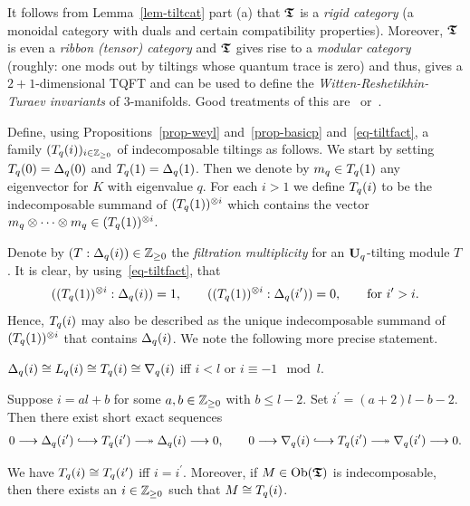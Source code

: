 \begin{rem}\label{rem-ribbon}
It follows from Lemma~\ref{lem-tiltcat} part (a) 
that $\boldsymbol{\mathfrak{T}}$ is a \textit{rigid category} 
(a monoidal category with duals and certain compatibility properties). 
Moreover, $\boldsymbol{\mathfrak{T}}$ is even a \textit{ribbon (tensor) category} and 
$\boldsymbol{\mathfrak{T}}$ gives rise to a \textit{modular category} 
(roughly: one mods out by tiltings whose quantum trace is zero) 
and thus, gives a $2+1$-dimensional TQFT and can 
be used to define the \textit{Witten-Reshetikhin-Turaev invariants} of $3$-manifolds. 
Good treatments of this are~\cite[Section~4]{an1} or~\cite[Section~7]{saw}.
\end{rem}



Define, using Propositions~\ref{prop-weyl} 
and~\ref{prop-basicp} and~\eqref{eq-tiltfact}, 
a family $(T_q({i}))_{i\in\mathbb{Z}_{\geq 0}}$ of indecomposable tiltings as follows. 
We start by setting $T_q({0})=\Delta_q({0})$ and $T_q({1})=\Delta_q({1})$. 
Then we denote by $m_q\in T_q({1})$ any eigenvector for $K$ with eigenvalue $q$. 
For each $i>1$ we define $T_q({i})$ to be the indecomposable 
summand of $(T_q({1}))^{\otimes i}$ which contains 
the vector $m_q\otimes\cdots\otimes m_q\in (T_q({1}))^{\otimes i}$.



Denote by $(T:\Delta_q({i}))\in\mathbb{Z}_{\geq 0}$ the \textit{filtration multiplicity} for an $\boldsymbol{\mathrm{U}}_q$-tilting module $T$. It is clear, by using~\eqref{eq-tiltfact}, that
\begin{equation}\label{eq-tiltfact2}
((T_q({1}))^{\otimes i}:\Delta_q({i}))=1,\quad\quad((T_q({1}))^{\otimes i}:\Delta_q({i^{\prime}}))=0,\quad\quad\text{for } i^{\prime}>i.
\end{equation}
Hence, $T_q({i})$ may also be described as 
the unique indecomposable summand of 
$(T_q({1}))^{\otimes i}$ that contains $\Delta_q({i})$. We note the following more precise statement.



\begin{prop}\label{prop-tilt}
\item[(a)] $\Delta_q({i})\cong L_q({i})\cong T_q({i})\cong\nabla_q({i})$ iff $i<l$ or $i\equiv -1\mod l$.
\item[(b)] Suppose $i=al+b$ for some $a,b\in\mathbb{Z}_{\geq 0}$ with 
$b\leq l-2$. Set $i^{\prime}=(a+2)l-b-2$. Then there exist short exact sequences
\[
0\longrightarrow \Vn{i^{\prime}}\hooklongrightarrow\Tn{i^{\prime}}\twoheadlongrightarrow \Vn{i}\longrightarrow 0,\quad\quad
0\longrightarrow \dVn{i}\hooklongrightarrow\Tn{i^{\prime}}\twoheadlongrightarrow \dVn{i^{\prime}}\longrightarrow 0.
\]
\item[(c)] We have $T_q({i})\cong T_q({i^{\prime}})$ 
iff $i=i^{\prime}$. Moreover, if $M\in\mathrm{Ob}(\boldsymbol{\mathfrak{T}})$ 
is indecomposable, then there 
exists an $i\in\mathbb{Z}_{\geq 0}$ such that $M\cong T_q({i})$.\makeqed
\end{prop}



